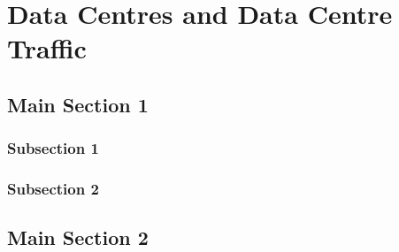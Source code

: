 
\chapter{Data Centres and Data Centre Traffic} %

\label{Chapter3} %



\section{Main Section 1}


\subsection{Subsection 1}



\subsection{Subsection 2}


\section{Main Section 2}

